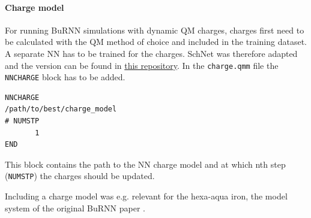 \paragraph{Charge model}
For running BuRNN simulations with dynamic QM charges, charges first need to be calculated with the QM method of choice and included in the training dataset. A separate NN has to be trained for the charges. SchNet was therefore adapted and the version can be found in \href{https://github.com/juliawestermayr/schnetpack}{this repository}.
In the \texttt{charge.qmm} file the \texttt{NNCHARGE} block has to be added. 

\begin{lstlisting}[breaklines=true, breakatwhitespace=false]
NNCHARGE
/path/to/best/charge_model
# NUMSTP
       1
END
\end{lstlisting}
This block contains the path to the NN charge model and at which nth step (\texttt{NUMSTP}) the charges should be updated.

Including a charge model was e.g. relevant for the hexa-aqua iron, the model system of the original BuRNN paper \cite{Lier2022BuRNN}.

